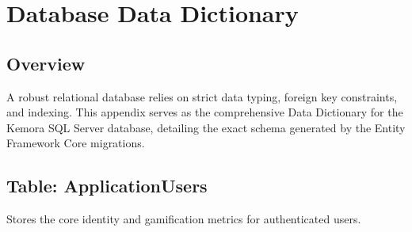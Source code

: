 \chapter{Database Data Dictionary}

\section{Overview}
A robust relational database relies on strict data typing, foreign key constraints, and indexing. This appendix serves as the comprehensive Data Dictionary for the Kemora SQL Server database, detailing the exact schema generated by the Entity Framework Core migrations.

\section{Table: ApplicationUsers}
Stores the core identity and gamification metrics for authenticated users.
